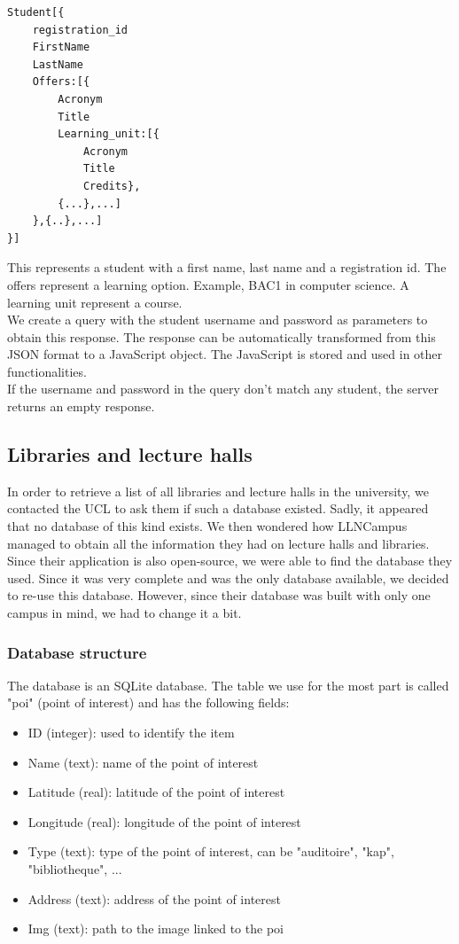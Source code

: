 \documentclass{eplmastersthesis}
\begin{document}
\begin{verbatim}
Student[{
    registration_id
    FirstName
    LastName
    Offers:[{
        Acronym
        Title
        Learning_unit:[{
            Acronym
            Title
            Credits},
        {...},...]
    },{..},...]
}]
\end{verbatim}
This represents a student with a first name, last name and a registration id. The offers represent a learning option. Example, BAC1 in computer science. A learning unit represent a course. \\

We create a query with the student username and password as parameters to obtain this response. The response can be automatically transformed from this JSON format to a JavaScript object. The JavaScript is stored and used in other functionalities.\\

If the username and password in the query don't match any student, the server returns an empty response. 



\subsection{Libraries and lecture halls}

In order to retrieve a list of all libraries and lecture halls in the university, we contacted the UCL to ask them if such a database existed. Sadly, it appeared that no database of this kind exists. We then wondered how LLNCampus managed to obtain all the information they had on lecture halls and libraries. Since their application is also open-source, we were able to find the database they used. Since it was very complete and was the only database available, we decided to re-use this database. However, since their database was built with only one campus in mind, we had to change it a bit.

\subsubsection{Database structure}
 
The database is an SQLite database. The table we use for the most part is called "poi" (point of interest) and has the following fields:

\begin{itemize}
\item ID (integer): used to identify the item
\item Name (text): name of the point of interest
\item Latitude (real): latitude of the point of interest
\item Longitude (real): longitude of the point of interest
\item Type (text): type of the point of interest, can be "auditoire", "kap",   "bibliotheque", ...
\item Address (text): address of the point of interest
\item Img (text): path to the image linked to the poi
\end{itemize}
\end{document}
